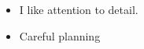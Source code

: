 \documentclass[10pt,a4paper,ragged2e,withhyper]{altacv}
\begin{document}


\begin{itemize}

    \item
    I like attention to detail.
    
    \item
    Careful planning

\end{itemize}




\end{document}
